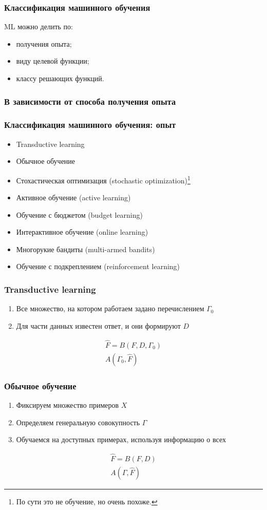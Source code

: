 \documentclass[14pt, fleqn, xcolor={dvipsnames, table}]{beamer}
\begin{document}
\begin{frame}
\frametitle{Классификация машинного обучения}
ML можно делить по:
\begin{itemize}
	\item { получения опыта;}
	\item виду целевой функции;
	\item классу решающих функций.
\end{itemize}
\end{frame}

\subsubsection{В зависимости от способа получения опыта}
\begin{frame}
\frametitle{Классификация машинного обучения: опыт}
\begin{itemize}
	\item Transductive learning
	\item Обычное обучение
	\item Стохастическая оптимизация (stochastic optimization)\footnote{По сути это не обучение, но очень похоже.}
	\item Активное обучение (active learning)
	\item Обучение с бюджетом (budget learning) 
	\item Интерактивное обучение (online learning)
	\item Многорукие бандиты (multi-armed bandits)
	\item Обучение с подкреплением (reinforcement learning) 
\end{itemize}
\end{frame}

\begin{frame}
\frametitle{Transductive learning}
\begin{enumerate}
	\item Все множество, на котором работаем задано перечислением $\Gamma_0$
	\item Для части данных известен ответ, и они формируют $D$
\end{enumerate}
$$\begin{array}{l}
\hat{F}=B(F, D, \Gamma_0) \\
A(\Gamma_0, \hat{F})
\end{array}$$
\end{frame}

\begin{frame}
\frametitle{Обычное обучение}
\begin{enumerate}
	\item Фиксируем множество примеров $X$
	\item Определяем генеральную совокупность $\Gamma$
	\item Обучаемся на доступных примерах, используя информацию о всех
\end{enumerate}
$$\begin{array}{l}
\hat{F} = B(F, D) \\
A(\Gamma, \hat{F})
\end{array}$$
\end{frame}
\end{document}
